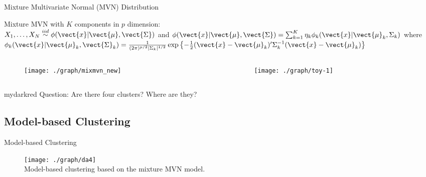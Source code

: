 \documentclass{beamer}
\begin{document}
\begin{frame}{Mixture Multivariate Normal (MVN) Distribution}

Mixture MVN with $K$ components in $p$ dimension: \\
$X_1, \ldots, X_N \stackrel{iid}{\sim}
\phi(\vect{x} | \vect{\mu}, \vect{\Sigma})$
and
$
\phi(\vect{x}| \vect{\mu}, \vect{\Sigma})
= \sum_{k = 1}^K \eta_k \phi_k(\vect{x}| \vect{\mu}_k, \Sigma_k)
$
where
$
\phi_k(\vect{x} | \vect{\mu}_k, \vect{\Sigma}_k)
=
\frac{1}{(2\pi)^{p/2} |\Sigma_k|^{1/2}}
\exp\left\{-\frac{1}{2}
(\vect{x} - \vect{\mu}_k)^\prime \Sigma_k^{-1} (\vect{x} - \vect{\mu}_k)
\right\}
$

\vspace{-0.7cm}

\begin{columns}

\begin{column}{0.55\textwidth}
  \begin{figure}
  \texttt{[image: ./graph/mixmvn\_new]}
  \end{figure}
\end{column}

\hspace{-0.3cm}

\begin{column}{0.55\textwidth}
  \begin{figure}
  \texttt{[image: ./graph/toy-1]}
  \end{figure}
\end{column}

\end{columns}

\vspace{-0.2cm}

\begin{center}
\begin{color}{mydarkred}
Question: Are there four clusters? Where are they?
\end{color}
\end{center}

\end{frame}


\subsection{Model-based Clustering}

\begin{frame}{Model-based Clustering}
\vspace{-0.5cm}

\begin{figure}
  \texttt{[image: ./graph/da4]}
  \\
  {\tiny Model-based clustering based on the mixture MVN model.}
\end{figure}

\end{frame}
\end{document}
